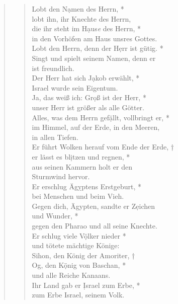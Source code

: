 



\begin{quote}
\begin{verse}

\smallskip

Lobt den N\d amen des Herrn, *\\ 
lobt ihn, ihr Knechte des Herrn, \\ \vin
die ihr steht im H\d aus\textit{e} des Herrn, *\\ \vin 
in den Vorhöfen am Haus unsres Gottes.\\ 
Lobt den Herrn, denn der H\d err ist gütig.  *\\ 
Singt und spielt seinem Namen, denn er \\ist freundlich.\\ \vin 
Der Herr hat sich J\d akob erwählt, *\\ \vin 
Israel wurde sein Eigentum.\\  
Ja, das weiß ich: Gr\d oß ist der Herr, *\\ 
unser Herr ist größer als alle Götter.\\ \vin  
Alles, was dem Herrn gef\d ällt, vollbringt er, *\\ \vin 
im Himmel, auf der Erde, in den Meeren,\\ \vin  in allen Tiefen.\\  
Er führt Wolken herauf vom Ende der Erde, †\\ 
er lässt es bl\d itzen und regnen, *\\  aus seinen Kammern holt er den \\Sturmwind hervor.\\ \vin  
Er erschlug Äg\d yptens Erstgeburt, *\\ \vin 
bei Menschen und beim Vieh.\\  
Gegen dich, Ägypten, sandte er Z\d eichen\\ und Wunder, *\\ 
gegen den Pharao und all seine Knechte.\\ \vin 
Er schlug viele V\d ölker nieder *\\ \vin 
und tötete mächtige Könige: \\
Sihon, den König der Amoriter, †\\   
Og, den K\d önig von Baschan, *\\  und alle Reiche Kanaans.\\ 
\vin Ihr Land gab er \d Israel zum Erbe, *\\ 
\vin zum Erbe Israel, seinem Volk.\\ 

\end{verse}
\end{quote}
